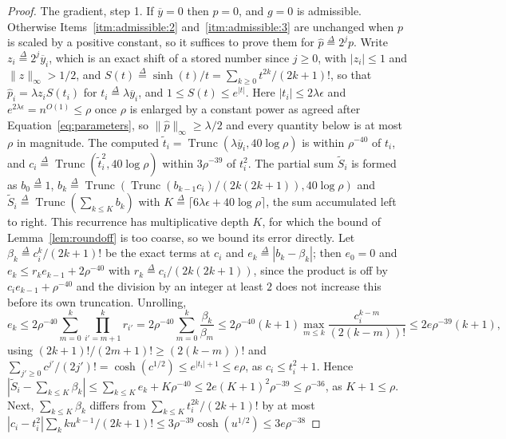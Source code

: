\documentclass[11pt]{article}
\newcommand{\Trunc}{\operatorname{Trunc}}
\newcommand{\defeq}{\stackrel{\Delta}{=}}
\begin{document}
\begin{proof}
The gradient, step 1.
If $\overline{y} = 0$ then
$p = 0$, and
$g = 0$ is admissible.
Otherwise Items~\ref{itm:admissible:2} and~\ref{itm:admissible:3} are unchanged
when $p$ is scaled by a positive constant, so it suffices to prove them for
$\widehat{p} \defeq 2^{j} p$.
Write $z_i \defeq 2^{j} \overline{y}_i$, which is an exact shift of a stored
number since $j \ge 0$, with
$|z_i| \le 1$ and
$\|z\|_{\infty} > 1/2$, and
$S(t) \defeq \sinh(t) / t = \sum_{k \ge 0} t^{2k} / (2k + 1)!$, so that
$\widehat{p}_i = \lambda z_i S(t_i)$ for
$t_i \defeq \lambda \overline{y}_i$, and
$1 \le S(t) \le e^{|t|}$.
Here $|t_i| \le 2 \lambda \epsilon$ and
$e^{2 \lambda \epsilon} = n^{O(1)} \le \rho$ once
$\rho$ is enlarged by a constant power as agreed after
Equation~\eqref{eq:parameters}, so $\|\widehat{p}\|_{\infty} \ge \lambda / 2$
and every quantity below is at most $\rho$ in magnitude.
The computed $\widetilde{t}_i = \Trunc(\lambda \overline{y}_i, 40 \log \rho)$ is
within $\rho^{-40}$ of
$t_i$, and
$c_i \defeq \Trunc(\widetilde{t}_i^{2}, 40 \log \rho)$ within
$3 \rho^{-39}$ of
$t_i^{2}$.
The partial sum $\widetilde{S}_i$ is formed as
$b_0 \defeq 1$,
$b_k \defeq \Trunc(\Trunc(b_{k - 1} c_i) / (2k (2k + 1)), 40 \log \rho)$ and
$\widetilde{S}_i \defeq \Trunc(\sum_{k \le K} b_k)$ with
$K \defeq \lceil 6 \lambda \epsilon + 40 \log \rho \rceil$, the sum accumulated
left to right.
This recurrence has multiplicative depth $K$, for which the bound of
Lemma~\ref{lem:roundoff} is too coarse, so we bound its error directly.
Let $\beta_k \defeq c_i^{k} / (2k + 1)!$ be the exact terms at
$c_i$ and
$e_k \defeq |b_k - \beta_k|$; then
$e_0 = 0$ and
$e_k \le r_k e_{k - 1} + 2 \rho^{-40}$ with
$r_k \defeq c_i / (2k (2k + 1))$, since the product is off by
$c_i e_{k - 1} + \rho^{-40}$ and the division by an integer at least
$2$ does not increase this before its own truncation.
Unrolling,
\[
e_k
\le
2 \rho^{-40} \sum_{m = 0}^{k} \prod_{i' = m + 1}^{k} r_{i'}
=
2 \rho^{-40} \sum_{m = 0}^{k} \frac{\beta_k}{\beta_m}
\le
2 \rho^{-40} (k + 1) \max_{m \le k} \frac{c_i^{k - m}}{(2 (k - m))!}
\le
2 e \rho^{-39} (k + 1),
\]
using $(2k + 1)! / (2m + 1)! \ge (2(k - m))!$ and
$\sum_{j' \ge 0} c^{j'} / (2j')! = \cosh(c^{1/2}) \le e^{|t_i| + 1} \le e \rho$,
as $c_i \le t_i^{2} + 1$.
Hence
$|\widetilde{S}_i - \sum_{k \le K} \beta_k| \le \sum_{k \le K} e_k + K \rho^{-40} \le 2 e (K + 1)^{2} \rho^{-39} \le \rho^{-36}$,
as $K + 1 \le \rho$.
Next, $\sum_{k \le K} \beta_k$ differs from
$\sum_{k \le K} t_i^{2k} / (2k + 1)!$ by at most
$|c_i - t_i^{2}| \sum_{k} k u^{k - 1} / (2k + 1)! \le 3 \rho^{-39} \cosh(u^{1/2}) \le 3 e \rho^{-38}$

\end{proof}
\end{document}
